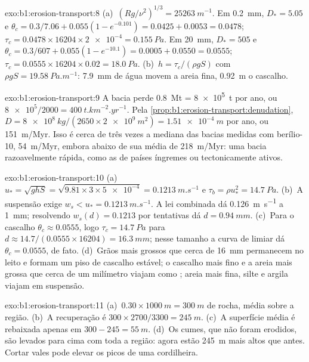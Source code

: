 \begin{solution}{exo:b1:erosion-transport:8}
(a)~$(Rg/\nu^2)^{1/3} = \qty{25263}{m^{-1}}$. Em \qty{0.2}{mm}, $D_* = 5.05$
e $\theta_c = 0.3/7.06 + 0.055(1 - e^{-0.101}) = 0.0425 + 0.0053 =
0.0478$; $\tau_c = 0.0478 \times 16204 \times \num{2e-4} = \qty{0.155}{Pa}$.
Em \qty{20}{mm}, $D_* = 505$ e $\theta_c = 0.3/607 + 0.055(1 - e^{-10.1}) =
0.0005 + 0.0550 = 0.0555$; $\tau_c = 0.0555 \times 16204 \times 0.02 =
\qty{18.0}{Pa}$. (b)~$h = \tau_c/(\rho g S)$ com $\rho g S =
\qty{19.58}{Pa.m^{-1}}$: \qty{7.9}{mm} de água movem a areia fina, \qty{0.92}{m}
o cascalho.
\end{solution}

\begin{solution}{exo:b1:erosion-transport:9}
A bacia perde \qty{0.8}{Mt} = \qty{8e5}{t} por ano, ou $\num{8e5}/2000 =
\qty{400}{t.km^{-2}.yr^{-1}}$. Pela \cref{prop:b1:erosion-transport:denudation},
$D = \qty{8e8}{kg}/(2650 \times \qty{2e9}{m^2}) = \qty{1.51e-4}{m}$ por ano, ou
\qty{151}{m/Myr}. Isso é cerca de três vezes a mediana das bacias medidas com berílio-10, \qty{54}{m/Myr}, embora abaixo de sua média de
\qty{218}{m/Myr}: uma bacia razoavelmente rápida, como as de países íngremes ou tectonicamente ativos.
\end{solution}

\begin{solution}{exo:b1:erosion-transport:10}
(a)~$u_* = \sqrt{g h S} = \sqrt{9.81 \times 3 \times \num{5e-4}} =
\qty{0.1213}{m.s^{-1}}$ e $\tau_b = \rho u_*^2 = \qty{14.7}{Pa}$.
(b)~A suspensão exige $w_s < u_* = \qty{0.1213}{m.s^{-1}}$. A lei combinada dá \qty{0.126}{m.s^{-1}} a \qty{1}{mm}; resolvendo
$w_s(d) = 0.1213$ por tentativas dá $d = \qty{0.94}{mm}$. (c)~Para o cascalho
$\theta_c \approx 0.0555$, logo $\tau_c = \qty{14.7}{Pa}$ para $d \approx
14.7/(0.0555 \times 16204) = \qty{16.3}{mm}$; nesse tamanho a curva de limiar dá
$\theta_c = 0.0555$, de fato. (d)~Grãos mais grossos que cerca de \qty{16}{mm} permanecem no leito e formam um piso de cascalho estável; o cascalho mais fino e a areia mais grossa que cerca de um milímetro viajam como ; areia mais fina, silte e argila viajam em suspensão.
\end{solution}

\begin{solution}{exo:b1:erosion-transport:11}
(a)~$0.30 \times \qty{1000}{m} = \qty{300}{m}$ de rocha, média sobre a
região. (b)~A recuperação é $300 \times 2700/3300 = \qty{245}{m}$. (c)~A superfície média é rebaixada apenas em
$300 - 245 = \qty{55}{m}$. (d)~Os cumes, que não foram erodidos, são levados para cima com toda a região: agora estão
\qty{245}{m} mais altos que antes. Cortar vales pode elevar os picos de uma cordilheira.
\end{solution}

